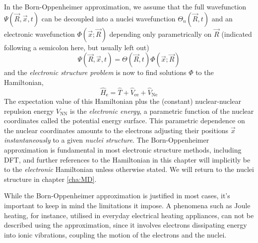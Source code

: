 \documentclass[11pt,bibliography=totoc,index=totoc]{scrbook}   %
\begin{document}


In the Born-Oppenheimer approximation, we assume that the full wavefunction $\Psi(\vec{R},\vec{x},t)$ can be decoupled into 
a nuclei wavefunction $\Theta_n(\vec{R},t)$ and an electronic wavefunction $\Phi(\vec{x};\vec{R})$ depending only parametrically on $\vec{R}$
(indicated following a semicolon here, but usually left out)
\begin{equation}
  \Psi(\vec{R},\vec{x},t) = \Theta(\vec{R},t)\Phi(\vec{x};\vec{R})
\end{equation}
and the \emph{electronic structure problem} is now to find solutions $\Phi$ to the Hamiltonian,
\begin{equation}
    \hat{H}_{\text{e}} = \hat{T} + \hat{V}_{\text{ee}} + \hat{V}_{\text{Ne}}
  \label{eq:el-hamiltonian}
\end{equation}
The expectation value of this Hamiltonian plus the (constant) nuclear-nuclear repulsion energy $V_{\text{NN}}$ is the \emph{electronic energy},\cite[110]{Cramer:2004}
a parametric function of the nuclear coordinates called the potential energy surface.
This parametric dependence on the nuclear coordinates amounts to the electrons adjusting their positions $\vec{x}$ \emph{instantaneously} to a given \emph{nuclei structure}.
The Born-Oppenheimer approximation is fundamental in most electronic structure methods, including DFT, and further references to the Hamiltonian in this chapter will implicitly be to the \emph{electronic} Hamiltonian unless otherwise stated. 
We will return to the nuclei structure in chapter \ref{cha:MD}.

While the Born-Oppenheimer approximation is justified in most cases,\cite[p. 111]{Cramer:2004} it's important to keep in mind the limitations it impose.
A phenomena such as Joule heating, for instance, utilised in everyday electrical heating appliances, can not be described using the approximation, since it involves electrons dissipating energy into ionic vibrations, coupling the motion of the electrons and the nuclei.\cite{Horsfield:2004b}
\end{document}
